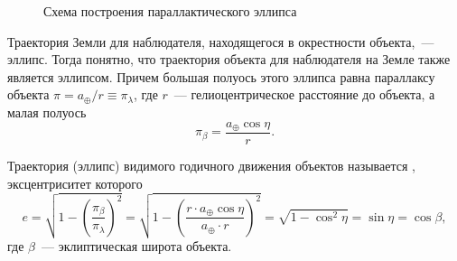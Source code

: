 \begin{wrapfigure}[10]{r}{0.47\tw}
	\caption{Схема построения параллактического эллипса}
	\label{pic:parallax-ellipse}
\end{wrapfigure}
Траектория Земли для наблюдателя, находящегося в окрестности объекта,~--- эллипс. Тогда понятно, что траектория объекта для наблюдателя на Земле также является эллипсом. Причем большая полуось этого эллипса равна параллаксу объекта $\pi = a_\oplus / r \equiv \pi_\lambda$, где $r$~--- гелиоцентрическое расстояние до объекта, а малая полуось
\begin{equation*}
	\pi_\beta = \frac{a_\oplus \cos \eta}{r}.
\end{equation*}

Траектория (эллипс) видимого годичного движения объектов называется , эксцентриситет которого
\begin{equation*}
	e
	= \sqrt{1 - \left(\frac{\pi_\beta}{\pi_\lambda} \right)^2}
	= \sqrt{1 - \left( \frac{r \cdot a_\oplus \cos \eta}{a_\oplus \cdot r}\right)^2}
	= \sqrt{1 - \cos^2 \eta} = \sin \eta = \cos \beta,
\end{equation*}
где $\beta$~--- эклиптическая широта объекта.

